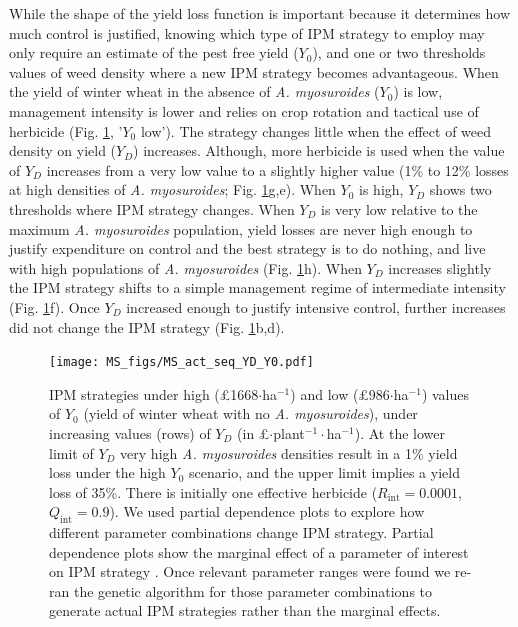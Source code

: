 \documentclass[12pt, a4paper]{article}
\begin{document}
While the shape of the yield loss function is important because it determines how much control is justified, knowing which type of IPM strategy to employ may only require an estimate of the pest free yield ($Y_0$), and one or two thresholds values of weed density where a new IPM strategy becomes advantageous. When the yield of winter wheat in the absence of \textit{A. myosuroides} ($Y_0$) is low, management intensity is lower and relies on crop rotation and tactical use of herbicide (Fig. \ref{fig:Y0_YD}, '$Y_0$ low'). The strategy changes little when the effect of weed density on yield ($Y_D$) increases. Although, more herbicide is used when the value of $Y_D$ increases from a very low value to a slightly higher value (1\% to 12\% losses at high densities of \textit{A. myosuroides}; Fig. \ref{fig:Y0_YD}g,e). When $Y_0$ is high, $Y_D$ shows two thresholds where IPM strategy changes. When $Y_D$ is very low relative to the maximum \textit{A. myosuroides} population, yield losses are never high enough to justify expenditure on control and the best strategy is to do nothing, and live with high populations of \textit{A. myosuroides} (Fig. \ref{fig:Y0_YD}h). When $Y_D$ increases slightly the IPM strategy shifts to a simple management regime of intermediate intensity (Fig. \ref{fig:Y0_YD}f). Once $Y_D$ increased enough to justify intensive control, further increases did not change the IPM strategy (Fig. \ref{fig:Y0_YD}b,d). 
\begin{figure}
	\centering
	\texttt{[image: MS\_figs/MS\_act\_seq\_YD\_Y0.pdf]}
	\caption{IPM strategies under high (\pounds 1668$\cdot$ha$^{-1}$) and low (\pounds 986$\cdot$ha$^{-1}$) values of $Y_0$ (yield of winter wheat with no \textit{A. myosuroides}), under increasing values (rows) of $Y_D$ (in \pounds$\cdot$plant$^{-1}\cdot$ha$^{-1}$). At the lower limit of $Y_D$ very high \textit{A. myosuroides} densities result in a 1\% yield loss under the high $Y_0$ scenario, and the upper limit implies a yield loss of 35\%. There is initially one effective herbicide ($R_\text{int} = 0.0001$, $Q_\text{int} = 0.9$). We used partial dependence plots to explore how different parameter combinations change IPM strategy. Partial dependence plots show the marginal effect of a parameter of interest on IPM strategy \citep{Frie2001, Mill2016}. Once relevant parameter ranges were found we re-ran the genetic algorithm for those parameter combinations to generate actual IPM strategies rather than the marginal effects.}
	\label{fig:Y0_YD} 
\end{figure}
\end{document}

